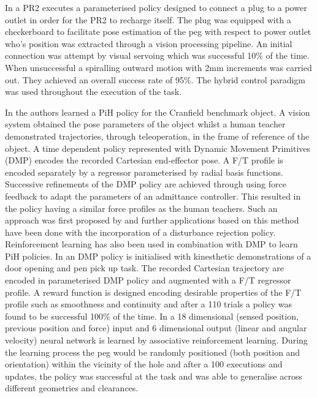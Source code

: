 In \cite{peg_personal_icra_2010} a PR2 executes a parameterised policy designed to connect a plug to a power outlet
in order for the PR2 to recharge itself. The plug was equipped with a checkerboard to facilitate pose estimation
of the peg with respect to power outlet who's position was extracted through a vision processing pipeline.
An initial connection was attempt by visual servoing which was successful 10\% of the time. When unsuccessful 
a spiralling outward motion with 2mm increments was carried out. They achieved an overall success rate of 95\%.
The hybrid control paradigm \cite{hybrid_1992} was used throughout the execution of the task.

In \cite{fast_peg_pbd_icmc_2014} the authors learned a PiH policy for the Cranfield benchmark object.
A vision system obtained the pose parameters of the object whilst a human teacher  
demonstrated trajectories, through teleoperation, in the frame of reference of the object. 
A time dependent policy represented with Dynamic Movement Primitives (DMP) \cite{Schaal04learningmovement} 
encodes the recorded Cartesian end-effector pose. A F/T profile is encoded separately by a regressor parameterised 
by radial basis functions. Successive refinements of the DMP policy are achieved through 
using force feedback to adapt the parameters of an admittance controller. This resulted in the policy having
a similar force profiles as the human teachers. Such an approach was first proposed by \cite{trans_workpiece_icra_2013}
and further applications based on this method have been done \cite{sol_pdg_pbd_2014} with the incorporation of  
a disturbance rejection policy.
Reinforcement learning has also been used in combination with DMP to learn PiH policies. In \cite{learn_force_c_icirs_2011}
an DMP policy is initialised with kinesthetic demonstrations of a door opening and pen pick up task. The recorded Cartesian trajectory
are encoded in parameterised DMP policy and augmented with a F/T regressor profile. A reward function is designed encoding desirable properties 
of the F/T profile such as smoothness and continuity and after a 110 trials a policy was found to be successful 100\% of the time.
In \cite{learn_admittance_icra_1994} a 18 dimensional (sensed position, previous position and force) input and 6 dimensional 
output (linear and angular velocity) neural network is learned by associative reinforcement learning. During the learning process the peg would be randomly 
positioned (both position and orientation) within the vicinity of the hole and after a 100 executions and 
updates, the policy was successful at the task and was able to generalise across different geometries and 
clearances. 

